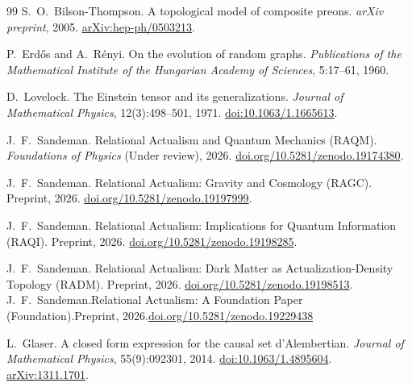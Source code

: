 \documentclass[11pt,a4paper]{article}
\begin{document}
\begin{thebibliography}{99}
S.~O.~Bilson-Thompson.
\newblock A topological model of composite preons.
\newblock \emph{arXiv preprint}, 2005.
\newblock \href{https://arxiv.org/abs/hep-ph/0503213}{arXiv:hep-ph/0503213}.

P.~Erd\H{o}s and A.~R\'{e}nyi.
\newblock On the evolution of random graphs.
\newblock \emph{Publications of the Mathematical Institute of the Hungarian
  Academy of Sciences}, 5:17--61, 1960.

D.~Lovelock.
\newblock The Einstein tensor and its generalizations.
\newblock \emph{Journal of Mathematical Physics}, 12(3):498--501, 1971.
\newblock \href{https://doi.org/10.1063/1.1665613}{doi:10.1063/1.1665613}.

J.~F.~Sandeman.
\newblock Relational Actualism and Quantum Mechanics ({RAQM}).
\newblock \textit{Foundations of Physics} (Under review), 2026.
\newblock \href{https://doi.org/10.5281/zenodo.19174380}{doi.org/10.5281/zenodo.19174380}.

J.~F.~Sandeman.
\newblock Relational Actualism: Gravity and Cosmology ({RAGC}).
\newblock Preprint, 2026.
\newblock \href{https://doi.org/10.5281/zenodo.19197999}{doi.org/10.5281/zenodo.19197999}.



J.~F.~Sandeman.
\newblock Relational Actualism: Implications for Quantum Information ({RAQI}).
\newblock Preprint, 2026.
\newblock \href{https://doi.org/10.5281/zenodo.19198285}{doi.org/10.5281/zenodo.19198285}.

J.~F.~Sandeman.
\newblock Relational Actualism: Dark Matter as Actualization-Density Topology ({RADM}).
\newblock Preprint, 2026.
\newblock \href{https://doi.org/10.5281/zenodo.19198513}{doi.org/10.5281/zenodo.19198513}.
J.~F.~Sandeman.\newblock Relational Actualism: A Foundation Paper ({Foundation}).\newblock Preprint, 2026.\newblock \href{https://doi.org/10.5281/zenodo.19229438}{doi.org/10.5281/zenodo.19229438}


L.~Glaser.
\newblock A closed form expression for the causal set d'Alembertian.
\newblock \emph{Journal of Mathematical Physics}, 55(9):092301, 2014.
\newblock \href{https://doi.org/10.1063/1.4895604}{doi:10.1063/1.4895604}.
\newblock \href{https://arxiv.org/abs/1311.1701}{arXiv:1311.1701}.


\end{thebibliography}
\end{document}
